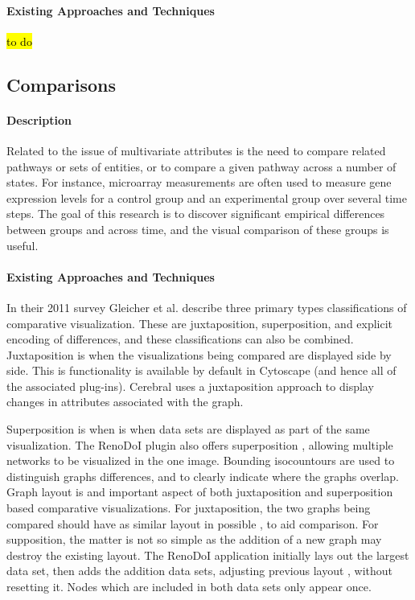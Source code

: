 \paragraph*{Existing Approaches and Techniques}

\hl{to do}

\subsection*{Comparisons}

\paragraph*{Description}

Related to the issue of multivariate attributes is the need to compare related pathways or sets of entities, or to compare a given pathway across a number of states.
For instance, microarray measurements are often used to measure gene expression levels for a control group and an experimental group over several time steps.
The goal of this research is to discover significant empirical differences between groups and across time, and the visual comparison of these groups is useful.

\paragraph*{Existing Approaches and Techniques}

In their 2011 survey Gleicher et al. \cite{Gleicher2011} describe three primary types  classifications of comparative visualization.
These are  juxtaposition, superposition,  and explicit encoding of differences, and these classifications can also be combined.
Juxtaposition is when the visualizations being compared are displayed side by side.
This is functionality is available by default in Cytoscape (and hence all of the associated plug-ins).
Cerebral uses a juxtaposition approach to display changes in attributes associated with the graph.

Superposition is when is when data sets are displayed as part of the same visualization.
The RenoDoI plugin also offers superposition , allowing multiple networks to be  visualized in the  one image. Bounding isocountours are used to distinguish graphs differences, and to clearly indicate where the graphs overlap.
Graph layout is and important aspect of both juxtaposition and superposition based comparative visualizations.
For juxtaposition, the two graphs being compared should have as similar layout in possible , to aid comparison.
For supposition, the matter is not so simple as the addition of a new graph may destroy the existing layout.
The RenoDoI application\cite{Vehlow2015} initially lays out the largest data set, then adds the addition data sets, adjusting previous layout , without resetting it.
Nodes which are  included in both data sets only appear once.

